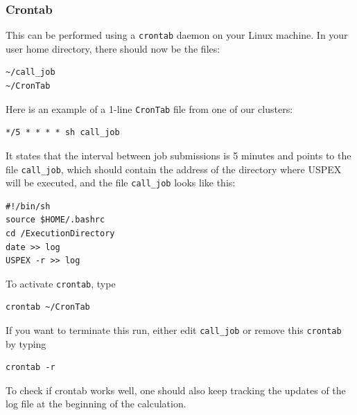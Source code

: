\documentclass[12pt]{article}
\newcommand{\keyword}[1]{\texttt{#1}}
\newcommand{\file}[1]{\texttt{#1}}
\begin{document}
\subsubsection{Crontab}
This can be performed using a \texttt{crontab} daemon on your Linux machine. In
your user home directory, there should now be the files:

\lstset{language=csh, frame=None, basicstyle=\footnotesize}
\begin{verbatim}
~/call_job
~/CronTab
\end{verbatim}

Here is an example of a 1-line \file{CronTab} file from one of our clusters:

\begin{lstlisting}
*/5 * * * * sh call_job
\end{lstlisting}

It states that the interval between job submissions is 5 minutes and points to
the file \file{call\_job}, which should contain the address of the directory
where USPEX will be executed, and the file \file{call\_job} looks like this:

\begin{lstlisting}
#!/bin/sh
source $HOME/.bashrc
cd /ExecutionDirectory
date >> log
USPEX -r >> log
\end{lstlisting}

To activate \keyword{crontab}, type

\begin{lstlisting}
crontab ~/CronTab
\end{lstlisting}

If you want to terminate this run, either edit \file{call\_job} or remove this
\keyword{crontab} by typing

\begin{lstlisting}
crontab -r
\end{lstlisting}

To check if crontab works well, one should also keep tracking the updates of the
log file at the beginning of the calculation.
\end{document}

